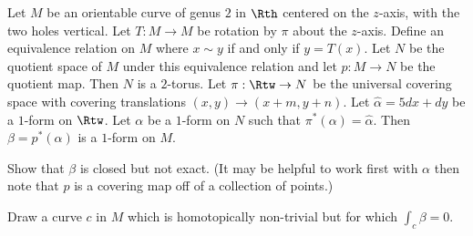 Let $M$ be an orientable curve of genus $2$ in $\Rth$ centered on the
$z$-axis, with the two holes vertical. Let $T:M\rightarrow M$ be
rotation by $\pi$ about the $z$-axis. Define an equivalence relation
on $M$ where $x\sim y$ if and only if $y=T(x)$. Let $N$ be the
quotient space of $M$ under this equivalence relation and let $p:M
\rightarrow N$ be the quotient map. Then $N$ is a $2$-torus.  Let
$\pi:\Rtw\rightarrow N$ be the universal covering space with covering
translations $(x,y)\rightarrow (x+m,y+n)$. Let $\hat{\alpha}=5dx+dy$
be a $1$-form on $\Rtw$. Let $\alpha$ be a $1$-form on $N$ such that
$\pi^*(\alpha)=\hat{\alpha}$. Then $\beta=p^*(\alpha)$ is a $1$-form
on $M$.
\begin{alist}
\item Show that $\beta$ is closed but not exact. (It may be helpful
to work first with $\alpha$ then note that $p$ is a covering map off
of a collection of points.)
\item Draw a curve $c$ in $M$ which is homotopically non-trivial but
for which $\int_{c}\beta=0$. 
\end{alist}
